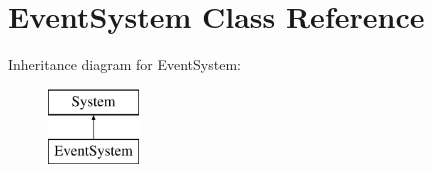 \hypertarget{class_event_system}{}\section{Event\+System Class Reference}
\label{class_event_system}
Inheritance diagram for Event\+System\+:\begin{figure}[H]
\begin{center}
\leavevmode
\includegraphics[height=2.000000cm]{class_event_system}
\end{center}
\end{figure}
